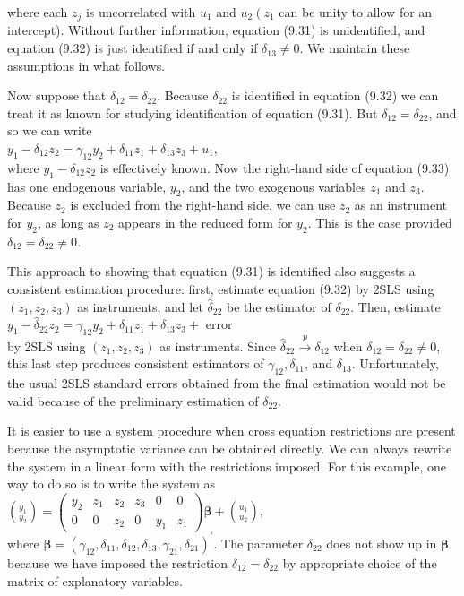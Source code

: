 \documentclass[10pt]{article}
\begin{document}
where each $z_{j}$ is uncorrelated with $u_{1}$ and $u_{2}\left(z_{1}\right.$ can be unity to allow for an intercept). Without further information, equation (9.31) is unidentified, and equation (9.32) is just identified if and only if $\delta_{13} \neq 0$. We maintain these assumptions in what follows.

Now suppose that $\delta_{12}=\delta_{22}$. Because $\delta_{22}$ is identified in equation (9.32) we can treat it as known for studying identification of equation (9.31). But $\delta_{12}=\delta_{22}$, and so we can write\\
$y_{1}-\delta_{12} z_{2}=\gamma_{12} y_{2}+\delta_{11} z_{1}+\delta_{13} z_{3}+u_{1}$,\\
where $y_{1}-\delta_{12} z_{2}$ is effectively known. Now the right-hand side of equation (9.33) has one endogenous variable, $y_{2}$, and the two exogenous variables $z_{1}$ and $z_{3}$. Because $z_{2}$ is excluded from the right-hand side, we can use $z_{2}$ as an instrument for $y_{2}$, as long as $z_{2}$ appears in the reduced form for $y_{2}$. This is the case provided $\delta_{12}=\delta_{22} \neq 0$.

This approach to showing that equation (9.31) is identified also suggests a consistent estimation procedure: first, estimate equation (9.32) by 2SLS using $\left(z_{1}, z_{2}, z_{3}\right)$ as instruments, and let $\hat{\delta}_{22}$ be the estimator of $\delta_{22}$. Then, estimate\\
$y_{1}-\hat{\delta}_{22} z_{2}=\gamma_{12} y_{2}+\delta_{11} z_{1}+\delta_{13} z_{3}+$ error\\
by 2SLS using $\left(z_{1}, z_{2}, z_{3}\right)$ as instruments. Since $\hat{\delta}_{22} \xrightarrow{p} \delta_{12}$ when $\delta_{12}=\delta_{22} \neq 0$, this last step produces consistent estimators of $\gamma_{12}, \delta_{11}$, and $\delta_{13}$. Unfortunately, the usual 2SLS standard errors obtained from the final estimation would not be valid because of the preliminary estimation of $\delta_{22}$.

It is easier to use a system procedure when cross equation restrictions are present because the asymptotic variance can be obtained directly. We can always rewrite the system in a linear form with the restrictions imposed. For this example, one way to do so is to write the system as\\
$\binom{y_{1}}{y_{2}}=\left(\begin{array}{cccccc}y_{2} & z_{1} & z_{2} & z_{3} & 0 & 0 \\ 0 & 0 & z_{2} & 0 & y_{1} & z_{1}\end{array}\right) \boldsymbol{\beta}+\binom{u_{1}}{u_{2}}$,\\
where $\boldsymbol{\beta}=\left(\gamma_{12}, \delta_{11}, \delta_{12}, \delta_{13}, \gamma_{21}, \delta_{21}\right)^{\prime}$. The parameter $\delta_{22}$ does not show up in $\boldsymbol{\beta}$ because we have imposed the restriction $\delta_{12}=\delta_{22}$ by appropriate choice of the matrix of explanatory variables.
\end{document}
